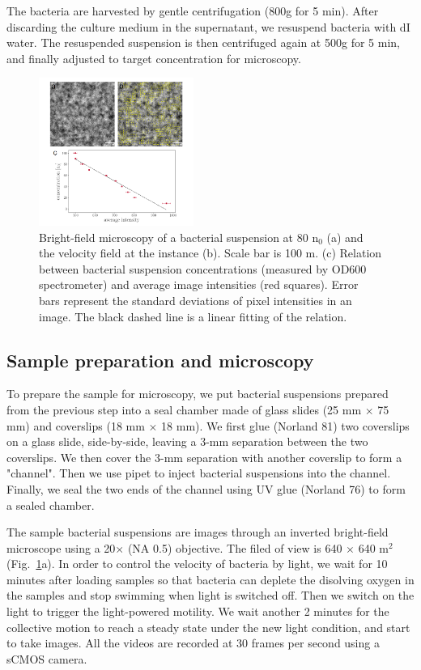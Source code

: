 \documentclass[twocolumn,aps,pre,amsmath,amssymb,floatfix,longbibliography]{revtex4-1}
\begin{document}
The bacteria are harvested by gentle centrifugation (800g for 5 min). After discarding the culture medium in the supernatant, we resuspend bacteria with dI water. The resuspended suspension is then centrifuged again at 500g for 5 min, and finally adjusted to target concentration for microscopy.

\begin{figure}[!]
\begin{center}
\includegraphics[width=0.45\textwidth]{GNF-figures-1.png}
\caption[]{Bright-field microscopy of a bacterial suspension at 80 n$_0$ (a) and the velocity field at the instance (b). Scale bar is 100 \textmu m. (c) Relation between bacterial suspension concentrations (measured by OD600 spectrometer) and average image intensities (red squares). Error bars represent the standard deviations of pixel intensities in an image. The black dashed line is a linear fitting of the relation. }
\label{fig:1}
\end{center}
\end{figure}

\subsection{Sample preparation and microscopy}

To prepare the sample for microscopy, we put bacterial suspensions prepared from the previous step into a seal chamber made of glass slides (25 mm $\times$ 75 mm) and coverslips (18 mm $\times$ 18 mm). We first glue (Norland 81) two coverslips on a glass slide, side-by-side, leaving a 3-mm separation between the two coverslips. We then cover the 3-mm separation with another coverslip to form a "channel". Then we use pipet to inject bacterial suspensions into the channel. Finally, we seal the two ends of the channel using UV glue (Norland 76) to form a sealed chamber.

The sample bacterial suspensions are images through an inverted bright-field microscope using a 20$\times$ (NA 0.5) objective. The filed of view is 640 $\times$ 640 \textmu m$^2$ (Fig.~\ref{fig:1}a). In order to control the velocity of bacteria by light, we wait for 10 minutes after loading samples so that bacteria can deplete the disolving oxygen in the samples and stop swimming when light is switched off. Then we switch on the light to trigger the light-powered motility. We wait another 2 minutes for the collective motion to reach a steady state under the new light condition, and start to take images. All the videos are recorded at 30 frames per second using a sCMOS camera.
\end{document}
